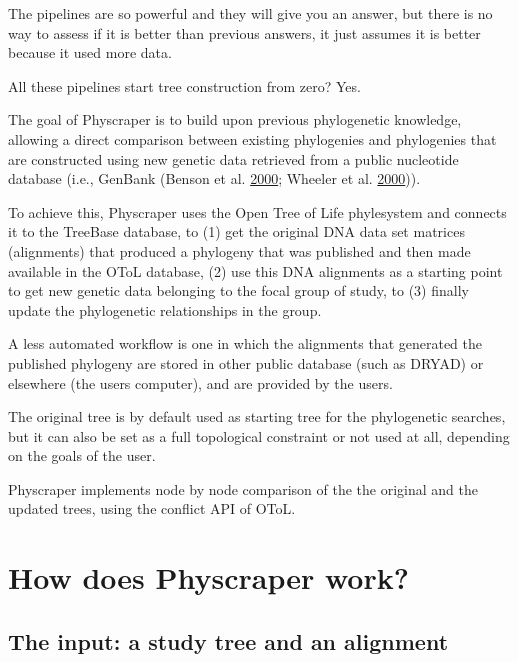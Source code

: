 \documentclass[]{article}
\begin{document}
The pipelines are so powerful and they will give you an answer, but there
is no way to assess if it is better than previous answers, it just assumes it is
better because it used more data.

All these pipelines start tree construction from zero? Yes.

The goal of Physcraper is to build upon previous phylogenetic knowledge,
allowing a direct comparison between existing phylogenies and phylogenies that are constructed
using new genetic data retrieved from a public nucleotide database (i.e., GenBank (Benson et al. \protect\hyperlink{ref-benson2000genbank}{2000}; Wheeler et al. \protect\hyperlink{ref-wheeler2000database}{2000})).

To achieve this, Physcraper uses the Open Tree of Life phylesystem and connects it
to the TreeBase database, to (1) get the original DNA data set matrices (alignments) that produced
a phylogeny that was published and then made available in the OToL database, (2)
use this DNA alignments as a starting point to get new genetic data belonging
to the focal group of study, to (3) finally update the phylogenetic relationships in the group.

A less automated workflow is one in which the alignments that generated the published
phylogeny are stored in other public database (such as DRYAD) or elsewhere (the users computer), and
are provided by the users.

The original tree is by default used as starting tree for the phylogenetic searches, but it
can also be set as a full topological constraint or not used at all, depending on
the goals of the user.

Physcraper implements node by node comparison of the the original and the updated trees, using the conflict API of OToL.

\hypertarget{how-does-physcraper-work}{%
\section{How does Physcraper work?}\label{how-does-physcraper-work}}

\hypertarget{the-input-a-study-tree-and-an-alignment}{%
\subsection{The input: a study tree and an alignment}\label{the-input-a-study-tree-and-an-alignment}}
\end{document}

